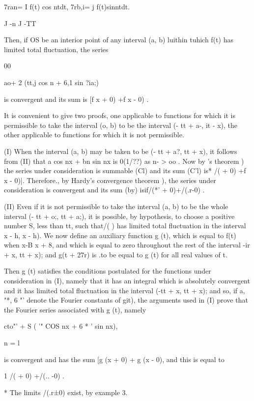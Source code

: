 7ran= I f(t) cos ntdt, 7rb,i= j f(t)sinntdt.

J -n J -TT

Then, if OS be an interior point of any interval (a, b) luithin tuhich
f(t) has limited total fluctuation, the series

00

 ao+ 2 (tt,j cos n + 6,1 sin ?ia;)

is convergent and its sum is [f x + 0) +f x - 0) .

It is convenient to give two proofs, one applicable to functions for
which it is permissible to take the interval (o, b) to be the interval
(- tt + a-, it - x), the other applicable to functions for which it is
not permissible.

(I) When the interval (a, b) may be taken to be (- tt + a?, tt + x),
it follows from (II) that a cos nx + bn sin nx is 0(1/??) as n-
> oo . Now by \Fejer's theorem ) the series under consideration
is summable (Cl) and its sum (C'l) is* /( + 0) +f x - 0)|. Therefore.,
by Hardy's convergence theorem ), the series under consideration
is convergent and its sum (by) isif/(*' + 0)+/(.r-0) .

(II) Even if it is not permissible to take the interval (a, b) to be
the whole interval (- tt + o;, tt + a;), it is possible, by
hypothesis, to choose a positive number S, less than tt, such that/( )
has limited total fluctuation in the interval x - h, x - h). We now
define an auxiliary function g (t), which is equal to f(t) when x-B%
x + 8, and which is equal to zero throughout the rest of the interval
-ir + x, tt + x); and g(t + 27r) is .to be equal to g (t) for all real
values of t.

Then g (t) satisfies the conditions postulated for the functions under
consideration in (I), namely that it has an integral which is
absolutely convergent and it has limited total fluctuation in the
interval (-tt + x, tt + x); and so, if a, "*, 6 "' denote the Fourier
constants of git), the arguments used in (I) prove that the Fourier
series associated with g (t), namely

  cto"' + S ( '" COS nx + 6 * ' sin nx),

n = l

is convergent and has the sum [g (x + 0) + g (x - 0), and this is
equal to

1 /( + 0) +/(.. -0) .

* The limits /(.r±0) exist, by example 3.

